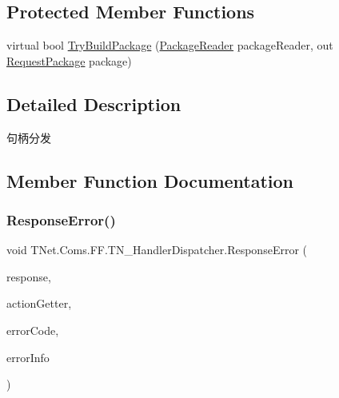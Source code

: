 \subsection*{Protected Member Functions}
\begin{DoxyCompactItemize}
\item 
virtual bool \mbox{\hyperlink{class_t_net_1_1_coms_1_1_f_f_1_1_t_n___handler_dispatcher_a2355b40ee512c5d479c3da514332f115}{Try\+Build\+Package}} (\mbox{\hyperlink{class_t_net_1_1_contract_1_1_package_reader}{Package\+Reader}} package\+Reader, out \mbox{\hyperlink{class_t_net_1_1_contract_1_1_request_package}{Request\+Package}} package)
\end{DoxyCompactItemize}


\subsection{Detailed Description}
句柄分发 



\subsection{Member Function Documentation}
\mbox{\label{class_t_net_1_1_coms_1_1_f_f_1_1_t_n___handler_dispatcher_a6f4ae769f23e643131d2040b9e0674f8}} 
\subsubsection{\texorpdfstring{Response\+Error()}{ResponseError()}}
{\footnotesize\ttfamily void T\+Net.\+Coms.\+F\+F.\+T\+N\+\_\+\+Handler\+Dispatcher.\+Response\+Error (\begin{DoxyParamCaption}\item[{\mbox{\hyperlink{class_t_net_1_1_service_1_1_base_game_response}{Base\+Game\+Response}}}]{response,  }\item[{\mbox{\hyperlink{class_t_net_1_1_service_1_1_action_getter}{Action\+Getter}}}]{action\+Getter,  }\item[{int}]{error\+Code,  }\item[{string}]{error\+Info }\end{DoxyParamCaption})}






